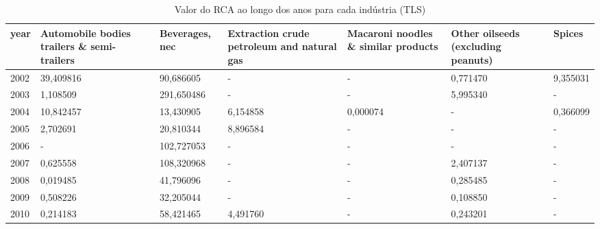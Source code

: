 \begin{table}
\centering
\caption{Valor do RCA ao longo dos anos para cada indústria (TLS)}
\begin{tabular}{p{1cm}p{2cm}p{2cm}p{2cm}p{2cm}p{2cm}p{2cm}}
\toprule
 year &  Automobile bodies trailers \& semi-trailers &  Beverages, nec &  Extraction crude petroleum and natural gas &  Macaroni noodles \& similar products &  Other oilseeds (excluding peanuts) &   Spices \\
\midrule
 2002 &                                   39,409816 &       90,686605 &                                           - &                                    - &                            0,771470 & 9,355031 \\
 2003 &                                    1,108509 &      291,650486 &                                           - &                                    - &                            5,995340 &        - \\
 2004 &                                   10,842457 &       13,430905 &                                    6,154858 &                             0,000074 &                                   - & 0,366099 \\
 2005 &                                    2,702691 &       20,810344 &                                    8,896584 &                                    - &                                   - &        - \\
 2006 &                                           - &      102,727053 &                                           - &                                    - &                                   - &        - \\
 2007 &                                    0,625558 &      108,320968 &                                           - &                                    - &                            2,407137 &        - \\
 2008 &                                    0,019485 &       41,796096 &                                           - &                                    - &                            0,285485 &        - \\
 2009 &                                    0,508226 &       32,205044 &                                           - &                                    - &                            0,108850 &        - \\
 2010 &                                    0,214183 &       58,421465 &                                    4,491760 &                                    - &                            0,243201 &        - \\

\end{tabular}
\end{table}
